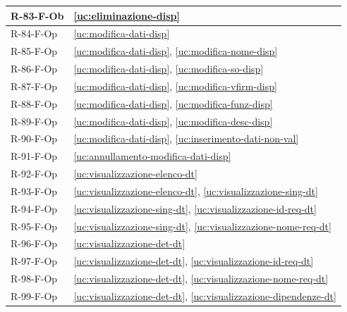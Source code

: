 ﻿\documentclass[a4paper,12pt]{article}
\begin{document}
{\begin{longtable}{|
      >{\centering\arraybackslash}p{}|
      >{\centering\arraybackslash}p{}|
      }
            R-83-F-Ob       & \ref{uc:eliminazione-disp}                                               \\ \hline
            R-84-F-Op       & \ref{uc:modifica-dati-disp}                                               \\ \hline
            R-85-F-Op       & \ref{uc:modifica-dati-disp}, \ref{uc:modifica-nome-disp}                 \\ \hline
            R-86-F-Op       & \ref{uc:modifica-dati-disp}, \ref{uc:modifica-so-disp}                 \\ \hline
            R-87-F-Op       & \ref{uc:modifica-dati-disp}, \ref{uc:modifica-vfirm-disp}                 \\ \hline
            R-88-F-Op       & \ref{uc:modifica-dati-disp}, \ref{uc:modifica-funz-disp}                 \\ \hline
            R-89-F-Op       & \ref{uc:modifica-dati-disp}, \ref{uc:modifica-desc-disp}                 \\ \hline
            R-90-F-Op       & \ref{uc:modifica-dati-disp}, \ref{uc:inserimento-dati-non-val}                     \\ \hline
            R-91-F-Op       & \ref{uc:annullamento-modifica-dati-disp}                                               \\ \hline
            R-92-F-Op       & \ref{uc:visualizzazione-elenco-dt}                                               \\ \hline
            R-93-F-Op       & \ref{uc:visualizzazione-elenco-dt}, \ref{uc:visualizzazione-sing-dt}                 \\ \hline
            R-94-F-Op       & \ref{uc:visualizzazione-sing-dt}, \ref{uc:visualizzazione-id-req-dt}             \\ \hline
            R-95-F-Op       & \ref{uc:visualizzazione-sing-dt}, \ref{uc:visualizzazione-nome-req-dt}             \\ \hline
            R-96-F-Op       & \ref{uc:visualizzazione-det-dt}                                               \\ \hline
            R-97-F-Op       & \ref{uc:visualizzazione-det-dt}, \ref{uc:visualizzazione-id-req-dt}                 \\ \hline
            R-98-F-Op       & \ref{uc:visualizzazione-det-dt}, \ref{uc:visualizzazione-nome-req-dt}                 \\ \hline
            R-99-F-Op       & \ref{uc:visualizzazione-det-dt}, \ref{uc:visualizzazione-dipendenze-dt}                 \\ \hline

\end{longtable}}
\end{document}
